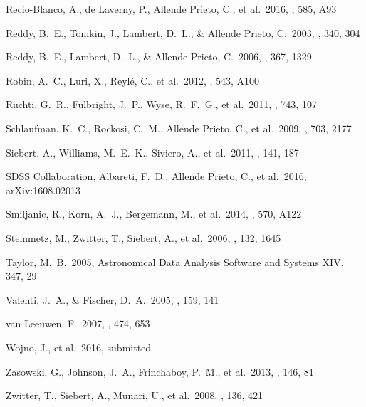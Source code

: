 \documentclass[preprint,trackchanges]{aastex}
\begin{document}
\begin{thebibliography}{dummy}
 Recio-Blanco, A., de Laverny, P., Allende Prieto, C., et al.\ 2016, \aap, 585, A93 

 Reddy, B.~E., Tomkin, J., Lambert, D.~L., \& Allende Prieto, C.\ 2003, \mnras, 340, 304 

 Reddy, B.~E., Lambert, D.~L., \& Allende Prieto, C.\ 2006, \mnras, 367, 1329 

 Robin, A.~C., Luri, X., Reyl{\'e}, C., et al.\ 2012, \aap, 543, A100 

 Ruchti, G.~R., Fulbright, J.~P., Wyse, R.~F.~G., et al.\ 2011, \apj, 743, 107 

 Schlaufman, K.~C., Rockosi, C.~M., Allende Prieto, C., et al.\ 2009, \apj, 703, 2177 

 Siebert, A., Williams, M.~E.~K., Siviero, A., et al.\ 2011, \aj, 141, 187 

 SDSS Collaboration, Albareti, F.~D., Allende Prieto, C., et al.\ 2016, arXiv:1608.02013 

 Smiljanic, R., Korn, A.~J., Bergemann, M., et al.\ 2014, \aap, 570, A122 

 Steinmetz, M., Zwitter, T., Siebert, A., et al.\ 2006, \aj, 132, 1645 

 Taylor, M.~B.\ 2005, Astronomical Data Analysis Software and Systems XIV, 347, 29 

 Valenti, J.~A., \& Fischer, D.~A.\ 2005, \apjs, 159, 141 

 van Leeuwen, F.\ 2007, \aap, 474, 653 

 Wojno, J., et al.\ 2016, submitted

 Zasowski, G., Johnson, J.~A., Frinchaboy, P.~M., et al.\ 2013, \aj, 146, 81 

 Zwitter, T., Siebert, A., Munari, U., et al.\ 2008, \aj, 136, 421 

\end{thebibliography}
\end{document}
